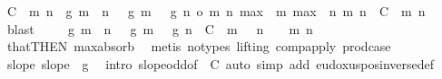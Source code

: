 \begin{isabellebody}
\ C\ \ {\isachardoublequoteopen}{\isasymbar}{\isacharparenleft}{\kern0pt}{\isacharparenleft}{\kern0pt}{\isasymlambda}{\isacharparenleft}{\kern0pt}m{\isacharcomma}{\kern0pt}\ n{\isacharparenright}{\kern0pt}{\isachardot}{\kern0pt}\ {\isacharquery}{\kern0pt}{\isasymphi}\ g\ {\isacharparenleft}{\kern0pt}m\ {\isacharplus}{\kern0pt}\ n{\isacharparenright}{\kern0pt}\ {\isacharminus}{\kern0pt}\ {\isacharparenleft}{\kern0pt}{\isacharquery}{\kern0pt}{\isasymphi}\ g\ m\ {\isacharplus}{\kern0pt}\ {\isacharquery}{\kern0pt}{\isasymphi}\ g\ n{\isacharparenright}{\kern0pt}{\isacharparenright}{\kern0pt}\ o\ {\isacharparenleft}{\kern0pt}{\isasymlambda}{\isacharparenleft}{\kern0pt}m{\isacharcomma}{\kern0pt}\ n{\isacharparenright}{\kern0pt}{\isachardot}{\kern0pt}\ {\isacharparenleft}{\kern0pt}max\ {}\ m{\isacharcomma}{\kern0pt}\ max\ {}\ n{\isacharparenright}{\kern0pt}{\isacharparenright}{\kern0pt}{\isacharparenright}{\kern0pt}\ {\isacharparenleft}{\kern0pt}m{\isacharcomma}{\kern0pt}\ n{\isacharparenright}{\kern0pt}{\isasymbar}\ {\isasymle}\ C{\isachardoublequoteclose}\ \ m\ n\ \isamarkupfalse%
\ blast\isanewline
\ \ \isamarkupfalse%
\ {\isachardoublequoteopen}{\isasymbar}{\isacharquery}{\kern0pt}{\isasymphi}\ g\ {\isacharparenleft}{\kern0pt}m\ {\isacharplus}{\kern0pt}\ n{\isacharparenright}{\kern0pt}\ {\isacharminus}{\kern0pt}\ {\isacharparenleft}{\kern0pt}{\isacharquery}{\kern0pt}{\isasymphi}\ g\ m\ {\isacharplus}{\kern0pt}\ {\isacharquery}{\kern0pt}{\isasymphi}\ g\ n{\isacharparenright}{\kern0pt}{\isasymbar}\ {\isasymle}\ C{\isachardoublequoteclose}\ \ {\isachardoublequoteopen}m\ {\isasymge}\ {}{\isachardoublequoteclose}\ {\isachardoublequoteopen}n\ {\isasymge}\ {}{\isachardoublequoteclose}\ \ m\ n\ \isamarkupfalse%
\ that{\isacharbrackleft}{\kern0pt}THEN\ max{\isacharunderscore}{\kern0pt}absorb{}{\isacharbrackright}{\kern0pt}\ \isamarkupfalse%
\ {\isacharparenleft}{\kern0pt}metis\ {\isacharparenleft}{\kern0pt}no{\isacharunderscore}{\kern0pt}types{\isacharcomma}{\kern0pt}\ lifting{\isacharparenright}{\kern0pt}\ comp{\isacharunderscore}{\kern0pt}apply\ prod{\isachardot}{\kern0pt}case{\isacharparenright}{\kern0pt}\isanewline
\ \ \isamarkupfalse%
\ slope{\isacharcolon}{\kern0pt}\ {\isachardoublequoteopen}slope\ {\isacharparenleft}{\kern0pt}{\isacharquery}{\kern0pt}{\isasymphi}\ g{\isacharparenright}{\kern0pt}{\isachardoublequoteclose}\ \isamarkupfalse%
\ {\isacharparenleft}{\kern0pt}intro\ slope{\isacharunderscore}{\kern0pt}odd{\isacharbrackleft}{\kern0pt}of\ {\isacharunderscore}{\kern0pt}\ C{\isacharbrackright}{\kern0pt}{\isacharparenright}{\kern0pt}\ {\isacharparenleft}{\kern0pt}auto\ simp\ add{\isacharcolon}{\kern0pt}\ eudoxus{\isacharunderscore}{\kern0pt}pos{\isacharunderscore}{\kern0pt}inverse{\isacharunderscore}{\kern0pt}def{\isacharparenright}{\kern0pt}\isanewline

\end{isabellebody}
